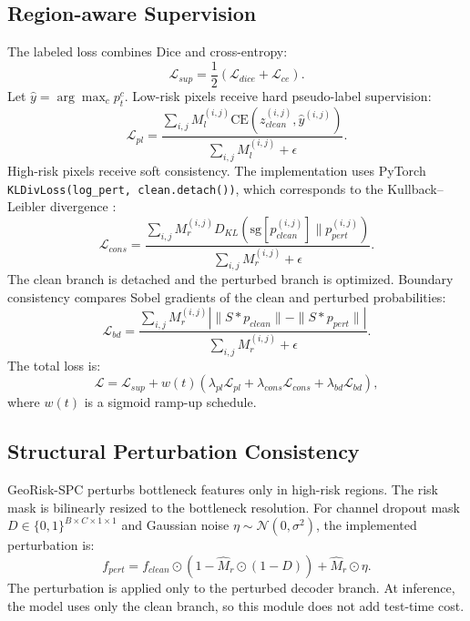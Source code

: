 \documentclass[journal]{IEEEtran}
\begin{document}
\subsection{Region-aware Supervision}
The labeled loss combines Dice and cross-entropy:
\begin{equation}
\mathcal{L}_{sup}=\frac{1}{2}(\mathcal{L}_{dice}+\mathcal{L}_{ce}).
\end{equation}
Let $\hat{y}=\arg\max_c p_t^c$. Low-risk pixels receive hard pseudo-label supervision:
\begin{equation}
\mathcal{L}_{pl}=\frac{\sum_{i,j}M_l^{(i,j)}\mathrm{CE}(z_{clean}^{(i,j)},\hat{y}^{(i,j)})}{\sum_{i,j}M_l^{(i,j)}+\epsilon}.
\end{equation}
High-risk pixels receive soft consistency. The implementation uses PyTorch \texttt{KLDivLoss(log\_pert, clean.detach())}, which corresponds to the Kullback--Leibler divergence \cite{kullback1951}:
\begin{equation}
\mathcal{L}_{cons}=\frac{\sum_{i,j}M_r^{(i,j)}D_{KL}(\mathrm{sg}[p_{clean}^{(i,j)}]\|p_{pert}^{(i,j)})}{\sum_{i,j}M_r^{(i,j)}+\epsilon}.
\end{equation}
The clean branch is detached and the perturbed branch is optimized. Boundary consistency compares Sobel gradients of the clean and perturbed probabilities:
\begin{equation}
\mathcal{L}_{bd}=\frac{\sum_{i,j}M_r^{(i,j)}\left|\|S*p_{clean}\|-\|S*p_{pert}\|\right|}{\sum_{i,j}M_r^{(i,j)}+\epsilon}.
\end{equation}
The total loss is:
\begin{equation}
\mathcal{L}=\mathcal{L}_{sup}+w(t)(\lambda_{pl}\mathcal{L}_{pl}+\lambda_{cons}\mathcal{L}_{cons}+\lambda_{bd}\mathcal{L}_{bd}),
\end{equation}
where $w(t)$ is a sigmoid ramp-up schedule.

\subsection{Structural Perturbation Consistency}
GeoRisk-SPC perturbs bottleneck features only in high-risk regions. The risk mask is bilinearly resized to the bottleneck resolution. For channel dropout mask $D\in\{0,1\}^{B\times C\times1\times1}$ and Gaussian noise $\eta\sim\mathcal{N}(0,\sigma^2)$, the implemented perturbation is:
\begin{equation}
f_{pert}=f_{clean}\odot(1-\hat{M}_r\odot(1-D))+\hat{M}_r\odot\eta.
\end{equation}
The perturbation is applied only to the perturbed decoder branch. At inference, the model uses only the clean branch, so this module does not add test-time cost.
\end{document}
